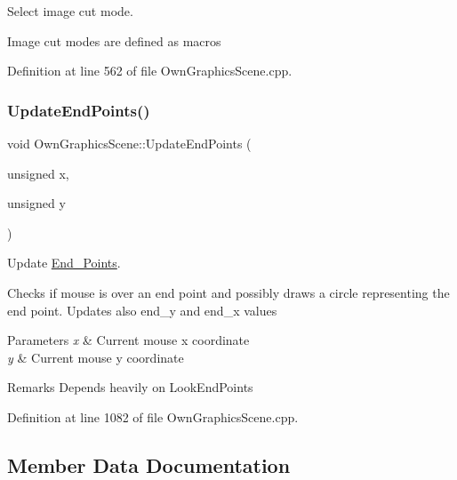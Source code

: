 Select image cut mode. 

Image cut modes are defined as macros 

Definition at line 562 of file Own\+Graphics\+Scene.\+cpp.

\mbox{\label{classOwnGraphicsScene_adf8d1495517483ba65c1ccbc95920a1c}} 
\subsubsection{\texorpdfstring{Update\+End\+Points()}{UpdateEndPoints()}}
{\footnotesize\ttfamily void Own\+Graphics\+Scene\+::\+Update\+End\+Points (\begin{DoxyParamCaption}\item[{unsigned}]{x,  }\item[{unsigned}]{y }\end{DoxyParamCaption})}



Update \mbox{\hyperlink{structEnd__Points}{End\+\_\+\+Points}}. 

Checks if mouse is over an end point and possibly draws a circle representing the end point. Updates also end\+\_\+y and end\+\_\+x values 
\begin{DoxyParams}{Parameters}
{\em x} & Current mouse x coordinate \\
\hline
{\em y} & Current mouse y coordinate \\
\hline
\end{DoxyParams}
\begin{DoxyRemark}{Remarks}
Depends heavily on Look\+End\+Points 
\end{DoxyRemark}


Definition at line 1082 of file Own\+Graphics\+Scene.\+cpp.



\subsection{Member Data Documentation}
\mbox{\label{classOwnGraphicsScene_a511dd73ffc0a5f3ee28e8950d0636f5e}} 
